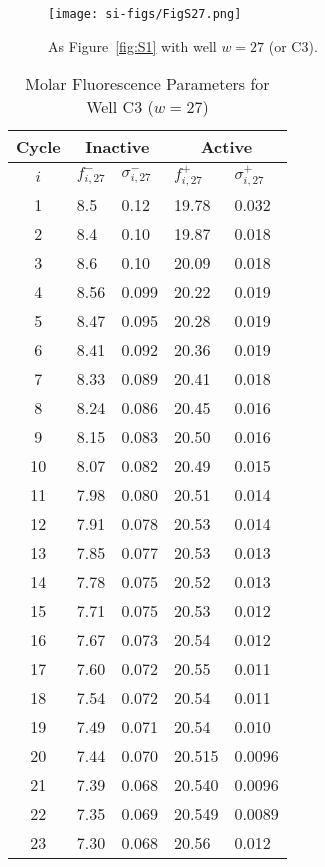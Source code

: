                 \begin{figure}
                    \centering
                    \texttt{[image: si-figs/FigS27.png]}
                    \caption{
                        As Figure~\ref{fig:S1} with well $w=27$ (or C3).
                    }
                \end{figure}
                \clearpage
    \begin{table}
        \caption{Molar Fluorescence Parameters for Well C3 ($w=27$)}
        \centering
        \begin{tabular}{c|ll|ll}
            Cycle & \multicolumn{2}{c|}{Inactive} & \multicolumn{2}{c}{Active} \\
            \hline
            $i$ & $f_{i,27}^{-}$ & $\sigma_{i,27}^{-}$ &  $f_{i,27}^{+}$ & $\sigma_{i,27}^{+}$ \\
            \hline
    1 & 8.5 & 0.12 & 19.78 & 0.032 \\
2 & 8.4 & 0.10 & 19.87 & 0.018 \\
3 & 8.6 & 0.10 & 20.09 & 0.018 \\
4 & 8.56 & 0.099 & 20.22 & 0.019 \\
5 & 8.47 & 0.095 & 20.28 & 0.019 \\
6 & 8.41 & 0.092 & 20.36 & 0.019 \\
7 & 8.33 & 0.089 & 20.41 & 0.018 \\
8 & 8.24 & 0.086 & 20.45 & 0.016 \\
9 & 8.15 & 0.083 & 20.50 & 0.016 \\
10 & 8.07 & 0.082 & 20.49 & 0.015 \\
11 & 7.98 & 0.080 & 20.51 & 0.014 \\
12 & 7.91 & 0.078 & 20.53 & 0.014 \\
13 & 7.85 & 0.077 & 20.53 & 0.013 \\
14 & 7.78 & 0.075 & 20.52 & 0.013 \\
15 & 7.71 & 0.075 & 20.53 & 0.012 \\
16 & 7.67 & 0.073 & 20.54 & 0.012 \\
17 & 7.60 & 0.072 & 20.55 & 0.011 \\
18 & 7.54 & 0.072 & 20.54 & 0.011 \\
19 & 7.49 & 0.071 & 20.54 & 0.010 \\
20 & 7.44 & 0.070 & 20.515 & 0.0096 \\
21 & 7.39 & 0.068 & 20.540 & 0.0096 \\
22 & 7.35 & 0.069 & 20.549 & 0.0089 \\
23 & 7.30 & 0.068 & 20.56 & 0.012 \\

\end{tabular}
\end{table}
